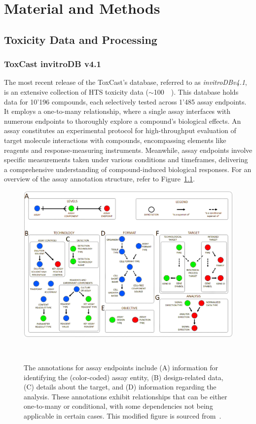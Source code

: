 \chapter{Material and Methods}\label{chap:material_and_methods}

\section{Toxicity Data and Processing}\label{sec:invitrodb}
\subsection{ToxCast invitroDB v4.1}
The most recent release of the ToxCast's database, referred to as \emph{invitroDBv4.1}, is an extensive collection of HTS toxicity data ($\sim$\SI{100}{\giga\byte}). This database holds data for 10'196 compounds, each selectively tested across 1'485 assay endpoints. It employs a one-to-many relationship, where a single assay interfaces with numerous endpoints to thoroughly explore a compound's biological effects. An assay constitutes an experimental protocol for high-throughput evaluation of target molecule interactions with compounds, encompassing elements like reagents and response-measuring instruments. Meanwhile, assay endpoints involve specific measurements taken under various conditions and timeframes, delivering a comprehensive understanding of compound-induced biological responses. For an overview of the assay annotation structure, refer to Figure~\ref{fig:assay}.

\begin{figure}  %
    \centering
    \includegraphics[width=1.0\textwidth]{figures/assay.png}  
    \caption{The annotations for assay endpoints include (A) information for identifying the (color-coded) assay entity, (B) design-related data, (C) details about the target, and (D) information regarding the analysis. These annotations exhibit relationships that can be either one-to-many or conditional, with some dependencies not being applicable in certain cases. This modified figure is sourced from~\cite{userguide}.}
~\label{fig:assay} 
\end{figure}

